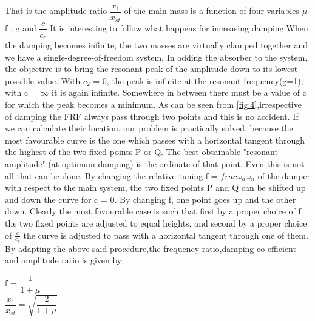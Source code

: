That is the amplitude ratio $\dfrac{x_1}{x_{st}}$ of the main mass is a function of four variables $\mu$  f , g and  $\dfrac{c}{c_c} $
It is interesting to follow what happens for increasing damping.When the damping becomes infinite, the two masses are virtually clamped together and we have a single-degree-of-freedom system.
In adding the absorber to the system, the objective is to bring the resonant peak of the amplitude down to its lowest possible value. With $c_2$ = 0, the peak is infinite at the resonant frequency(g=1); with c = $\infty$ it is again infinite. Somewhere in between there must be a value of c for which the peak becomes a minimum.
As can be seen from \ref{fig:4},irrespective of damping the FRF always pass through two points and this is no accident. If we can calculate their location, our problem is practically solved, because the most favourable curve is the one which passes with a horizontal tangent through the highest of the two fixed points P or Q. The best obtainable "resonant amplitude" (at optimum damping) is the ordinate of that point.
Even this is not all that can be done. By changing the relative tuning f = $frac{\omega_a}{\omega_n}$ of the damper with respect to the main system, the two fixed points P and Q can be shifted up and down
the curve for c = 0. By changing f, one point goes up and the other down. Clearly the most favourable case is such that first by a proper choice of f the two fixed points are adjusted to equal heights, and second by a proper choice of $\frac{c}{c_c}$ the curve is adjusted
to pass with a horizontal tangent through one of them.
By adapting the above said procedure,the frequency ratio,damping co-efficient and amplitude ratio is given by:
\begin{center}
f = $\dfrac{1}{1+\mu}$\\

$\dfrac{x_1}{x_{st}}= \sqrt{\dfrac{2}{1+\mu}}$
\end{center}

